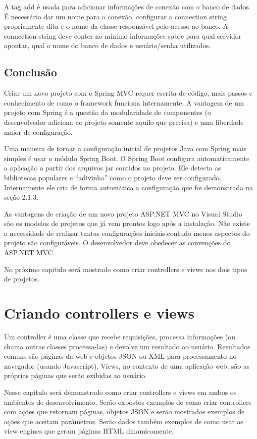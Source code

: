 \documentclass[a4paper,12pt]{article}
\begin{document}
A tag add é usada para adicionar informações de conexão com o banco de dados. É necessário dar um nome para a conexão, configurar a connection string propriamente dita e o nome da classe responsável pelo acesso ao banco. A connection string deve conter no mínimo informações sobre para qual servidor apontar, qual o nome do banco de dados e usuário/senha utilizados. 

\subsection{Conclusão}

Criar um novo projeto com o Spring MVC requer escrita de código, mais passos e conhecimento de como o framework funciona internamente. A vantagem de um projeto com Spring é a questão da modularidade de componentes (o desenvolvedor adiciona ao projeto somente aquilo que precisa) e uma liberdade maior de configuração.

Uma maneira de tornar a configuração inicial de projetos Java com Spring mais simples é usar o módulo Spring Boot. O Spring Boot configura automaticamente a aplicação a partir dos arquivos jar contidos no projeto. Ele detecta as bibliotecas populares e “adivinha” como o projeto deve ser configurado. Internamente ele cria de forma automática a configuração que foi demonstrada na seção 2.1.3.

As vantagens de criação de um novo projeto ASP.NET MVC no Visual Studio são os modelos de projetos que já vem prontos logo após a instalação. Não existe a necessidade de realizar tantas configurações iniciais,contudo menos aspectos do projeto são configuráveis. O desenvolvedor deve obedecer as convenções do ASP.NET MVC.

No próximo capitulo será mostrado como criar controllers e views nos dois tipos de projetos.

\newpage
\section{Criando controllers e views}

Um controller é uma classe que  recebe requisições, processa informações (ou chama outras classes processa-las) e devolve um resultado ao usuário. Resultados comuns são páginas da web e objetos JSON ou XML para processamento no navegador (usando Javascript). Views, no contexto de uma aplicação web, são as próprias páginas que serão exibidas ao usuário.

Nesse capitulo será demonstrado como criar controllers e views em ambos os ambientes de desenvolvimento. Serão expostos exemplos de como criar controllers com ações que retornam páginas, objetos JSON e serão mostrados exemplos de ações que aceitam parâmetros. Serão dados também exemplos de como usar as view engines que geram páginas HTML dinamicamente.
\end{document}
